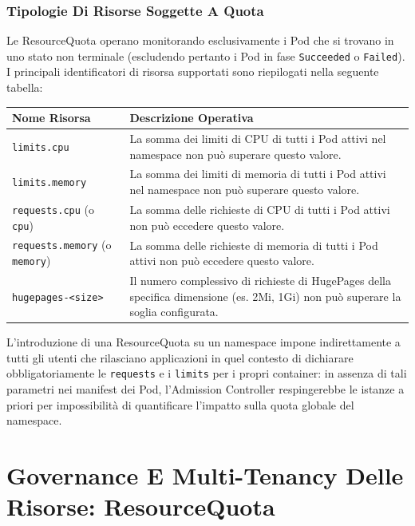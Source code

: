 \documentclass[11pt, a4paper]{article}
\begin{document}
\subsubsection{Tipologie Di Risorse Soggette A Quota}
Le ResourceQuota operano monitorando esclusivamente i Pod che si trovano in uno stato non terminale (escludendo pertanto i Pod in fase \texttt{Succeeded} o \texttt{Failed}). I principali identificatori di risorsa supportati sono riepilogati nella seguente tabella:

\begin{center}
\begin{tabularx}{\textwidth}{lX}
    \toprule
    \textbf{Nome Risorsa} & \textbf{Descrizione Operativa} \\
    \midrule
    \texttt{limits.cpu} & La somma dei limiti di CPU di tutti i Pod attivi nel namespace non può superare questo valore. \\
    \addlinespace
    \texttt{limits.memory} & La somma dei limiti di memoria di tutti i Pod attivi nel namespace non può superare questo valore. \\
    \addlinespace
    \texttt{requests.cpu} (o \texttt{cpu}) & La somma delle richieste di CPU di tutti i Pod attivi non può eccedere questo valore. \\
    \addlinespace
    \texttt{requests.memory} (o \texttt{memory}) & La somma delle richieste di memoria di tutti i Pod attivi non può eccedere questo valore. \\
    \addlinespace
    \texttt{hugepages-<size>} & Il numero complessivo di richieste di HugePages della specifica dimensione (es. 2Mi, 1Gi) non può superare la soglia configurata. \\
    \bottomrule
\end{tabularx}
\end{center}

L'introduzione di una ResourceQuota su un namespace impone indirettamente a tutti gli utenti che rilasciano applicazioni in quel contesto di dichiarare obbligatoriamente le \texttt{requests} e i \texttt{limits} per i propri container: in assenza di tali parametri nei manifest dei Pod, l'Admission Controller respingerebbe le istanze a priori per impossibilità di quantificare l'impatto sulla quota globale del namespace.


\section{Governance E Multi-Tenancy Delle Risorse: ResourceQuota}
\end{document}

